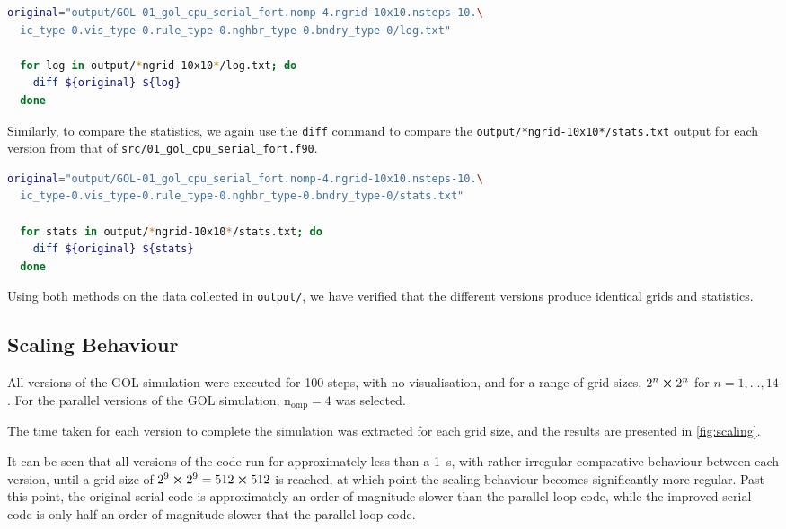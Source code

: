 \documentclass[]{article}
\begin{document}
\begin{lstlisting}[language=Bash]
  original="output/GOL-01_gol_cpu_serial_fort.nomp-4.ngrid-10x10.nsteps-10.\
  ic_type-0.vis_type-0.rule_type-0.nghbr_type-0.bndry_type-0/log.txt"

  for log in output/*ngrid-10x10*/log.txt; do
    diff ${original} ${log}
  done
\end{lstlisting}

Similarly, to compare the statistics, we again use the \lstinline{diff} command
to compare the \lstinline[style=ff]{output/*ngrid-10x10*/stats.txt} output
for each version from that of
\lstinline[style=ff]{src/01_gol_cpu_serial_fort.f90}.

\begin{lstlisting}[language=Bash]
  original="output/GOL-01_gol_cpu_serial_fort.nomp-4.ngrid-10x10.nsteps-10.\
  ic_type-0.vis_type-0.rule_type-0.nghbr_type-0.bndry_type-0/stats.txt"

  for stats in output/*ngrid-10x10*/stats.txt; do
    diff ${original} ${stats}
  done
\end{lstlisting}

Using both methods on the data collected in \lstinline[style=ff]{output/}, we
have verified that the different versions produce identical grids and
statistics.

\subsection{Scaling Behaviour}
\label{sec:scaling-behaviour}

All versions of the GOL simulation were executed for 100 steps, with no
visualisation, and for a range of grid sizes, $2^{n} \cross 2^{n}$ for $n = 1,
\dotsc, 14$.
For the parallel versions of the GOL simulation, $\mathrm{n_{omp}} = 4$ was
selected.

The time taken for each version to complete the simulation was extracted for
each grid size, and the results are presented in \autoref{fig:scaling}.

It can be seen that all versions of the code run for approximately less than a
\SI{1}{\second}, with rather irregular comparative behaviour between each
version, until a grid size of $2^{9} \cross 2^{9} = 512 \cross 512$ is reached,
at which point the scaling behaviour becomes significantly more regular.
Past this point, the original serial code is approximately an order-of-magnitude
slower than the parallel loop code, while the improved serial code is only half
an order-of-magnitude slower that the parallel loop code.
\end{document}
